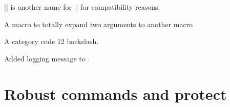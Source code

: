 \begin{macro}{\@firstofone}
\begin{macro}{\@firstoftwo}
\begin{macro}{\@secondoftwo}
\begin{teX}
\long{}
\long{}
\long{}
\end{teX}

\begin{macro}{\@iden}
    |\@iden| is another name for |\@firstofone| for
    compatibility reasons.
\begin{teX}
\let\@iden\@firstofone
\end{teX}
\end{macro}
\end{macro}
\end{macro}
\end{macro}
%
\begin{macro}{\@thirdofthree}

\begin{teX}
\long{}
\end{teX}
\end{macro}
%
%
\begin{macro}{\@expandtwoargs}
 A macro to totally expand two arguments to another macro
   
\begin{teX}
\def\@expandtwoargs#1#2#3{%
\edef\reserved@a{\noexpand#1{#2}{#3}}\reserved@a}
\end{teX}
\end{macro}

\begin{macro}{\@backslashchar}
    A category code 12 backslash.
\begin{teX}
\edef\@backslashchar{\expandafter\@gobble\string\\}
\end{teX}
\end{macro}

Added logging message to
    .

 \section{Robust commands and protect}

